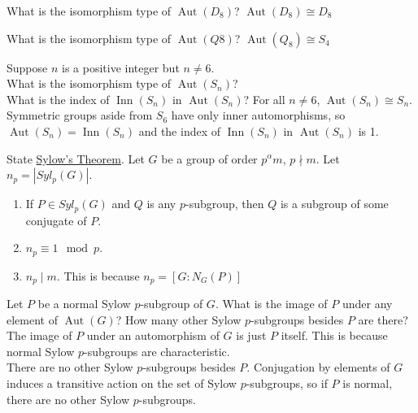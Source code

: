 \documentclass[avery5371,grid]{flashcards}
\DeclareMathOperator{\Aut}{Aut}
\DeclareMathOperator{\Inn}{Inn}
\begin{document}
\begin{flashcard}[Groups]{What is the isomorphism type of $\Aut(D_8)$?}
 $\Aut(D_8) \cong D_8$
\end{flashcard}

\begin{flashcard}[Groups]{What is the isomorphism type of $\Aut(Q8)$?}
 $\Aut(Q_8) \cong S_4$
\end{flashcard}

\begin{flashcard}[Groups]{Suppose $n$ is a positive integer but $n \neq 6$.\\ What is the isomorphism type of $\Aut(S_n)$? \\ What is the index of $\Inn(S_n)$ in $\Aut(S_n)$?}
 For all $n \neq 6$, $\Aut(S_n) \cong S_n$.\\
 
Symmetric groups aside from $S_6$ have only inner automorphisms, so $\Aut(S_n) = \Inn(S_n)$ and the index of $\Inn(S_n)$ in $\Aut(S_n)$ is 1.
\end{flashcard}

\begin{flashcard}[Groups]{State \underline{Sylow's Theorem}.}
 Let $G$ be a group of order $p^\alpha m$, $p \nmid m$. Let $n_p = |Syl_p(G)|$.
 \begin{enumerate}
      \item If $P \in Syl_p(G)$ and $Q$ is any $p$-subgroup, then $Q$ is a subgroup of some conjugate of $P$.
      \item $n_p \equiv 1 \mod p$.
      \item $n_p \mid m.$ This is because $n_p = [G:N_G(P)]$
 \end{enumerate}
\end{flashcard}

\begin{flashcard}[Groups]{Let $P$ be a normal Sylow $p$-subgroup of $G$. What is the image of $P$ under any element of $\Aut(G)$? How many other Sylow $p$-subgroups besides $P$ are there?}
 The image of $P$ under an automorphism of $G$ is just $P$ itself. This is because normal Sylow $p$-subgroups are characteristic.\\
 
 There are no other Sylow $p$-subgroups besides $P$. Conjugation by elements of $G$ induces a transitive action on the set of Sylow $p$-subgroups, so if $P$ is normal, there are no other Sylow $p$-subgroups.
\end{flashcard}
\end{document}
